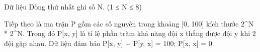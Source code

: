 Dữ liệu  
Dòng thứ nhất ghi số N. (1 ≤ N ≤ 8)  

   Tiếp theo là ma trận P gồm các số nguyên trong khoảng [0, 100] kích thước 2^N * 2^N. Trong đó P[x, y] là tỉ lệ phần trăm khả năng đội x thắng được đội y khi 2 đội gặp nhau. Dữ liệu đảm bảo P[x, y] + P[y, x] = 100; P[x, x] = 0.